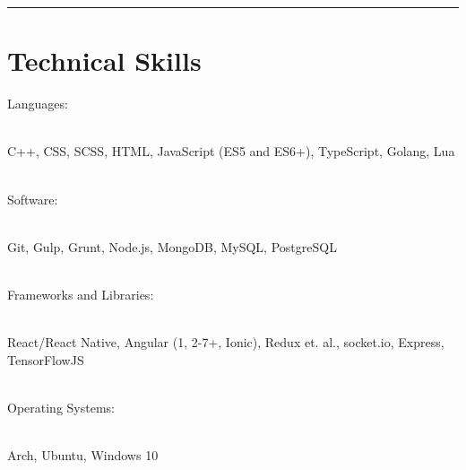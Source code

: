 \noindent\rule{0.9\hsize}{0.4pt}
\section{\normalsize{Technical Skills}}

Languages:\\\\
\parbox{\dimexpr\linewidth-2\fboxsep-2\fboxrule}{C++, CSS, SCSS, HTML, JavaScript (ES5 and ES6+), TypeScript, Golang, Lua}
\vspace{2\baselineskip}
\\
Software:\\\\
\parbox{\dimexpr\linewidth-2\fboxsep-2\fboxrule}{Git, Gulp, Grunt, Node.js, MongoDB, MySQL, PostgreSQL}
\vspace{2\baselineskip}
\\
Frameworks and Libraries:\\\\
\parbox{\dimexpr\linewidth-2\fboxsep-2\fboxrule}{React/React Native, Angular (1, 2-7+, Ionic), Redux et. al., socket.io, Express, TensorFlowJS}
\vspace{2\baselineskip}
\\
Operating Systems:\\\\
\parbox{\dimexpr\linewidth-2\fboxsep-2\fboxrule}{Arch, Ubuntu, Windows 10}
\\
